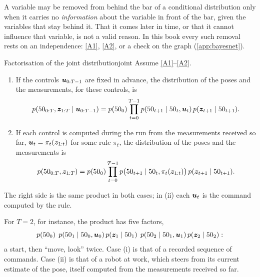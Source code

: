 \begin{pitfall}
A variable may be removed from behind the bar of a conditional distribution
only when it carries no \emph{information} about the variable in front of
the bar, given the variables that stay behind it. That it comes later in
time, or that it cannot influence that variable, is not a valid reason.
In this book every such removal rests on an independence: \ref{A1},
\ref{A2}, or a check on the graph (\cref{app:bayesnet}).
\end{pitfall}

\begin{proposition}{Factorisation of the joint distribution}{joint}
Assume \ref{A1}--\ref{A2}.
\begin{enumerate}[label=(\roman*),nosep]
  \item If the controls $\bm{u}_{0:T-1}$ are fixed in advance, the
    distribution of the poses and the measurements, for these controls,
    is
    \begin{equation}\label{eq:joint}
      p(50_{0:T},\bm{z}_{1:T}\mid\bm{u}_{0:T-1})=p(50_0)\prod_{t=0}^{T-1}
      p(50_{t+1}\mid50_t,\bm{u}_t)\,p(\bm{z}_{t+1}\mid50_{t+1}).
    \end{equation}
  \item If each control is computed during the run from the measurements
    received so far, $\bm{u}_t=\pi_t(\bm{z}_{1:t})$ for some rule $\pi_t$, the
    distribution of the poses and the measurements is
    \begin{equation}\label{eq:jointfb}
      p(50_{0:T},\bm{z}_{1:T})=p(50_0)\prod_{t=0}^{T-1}
      p\bigl(50_{t+1}\mid50_t,\pi_t(\bm{z}_{1:t})\bigr)\,
      p(\bm{z}_{t+1}\mid50_{t+1}).
    \end{equation}
\end{enumerate}
The right side is the same product in both cases; in (ii) each $\bm{u}_t$ is
the command computed by the rule.
\end{proposition}

For $T=2$, for instance, the product has five factors,
\[
  p(50_0)\;\,p(50_1\mid50_0,\bm{u}_0)\,p(\bm{z}_1\mid50_1)\;\,
  p(50_2\mid50_1,\bm{u}_1)\,p(\bm{z}_2\mid50_2):
\]
a start, then ``move, look'' twice. Case (i) is that of a recorded
sequence of commands. Case (ii) is that of a robot at work, which steers
from its current estimate of the pose, itself computed from the
measurements received so far.

